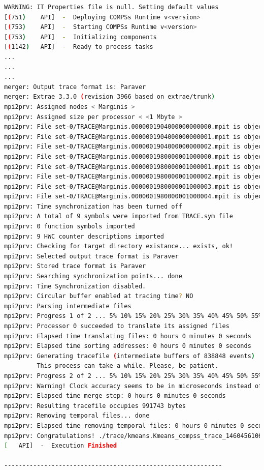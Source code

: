 \begin{lstlisting}[language=bash]
WARNING: IT Properties file is null. Setting default values
[(751)    API]  -  Deploying COMPSs Runtime v<version>
[(753)    API]  -  Starting COMPSs Runtime v<version>
[(753)    API]  -  Initializing components
[(1142)   API]  -  Ready to process tasks
...
...
...
merger: Output trace format is: Paraver
merger: Extrae 3.3.0 (revision 3966 based on extrae/trunk)
mpi2prv: Assigned nodes < Marginis >
mpi2prv: Assigned size per processor < <1 Mbyte >
mpi2prv: File set-0/TRACE@Marginis.0000001904000000000000.mpit is object 1.1.1 on node Marginis assigned to processor 0
mpi2prv: File set-0/TRACE@Marginis.0000001904000000000001.mpit is object 1.1.2 on node Marginis assigned to processor 0
mpi2prv: File set-0/TRACE@Marginis.0000001904000000000002.mpit is object 1.1.3 on node Marginis assigned to processor 0
mpi2prv: File set-0/TRACE@Marginis.0000001980000001000000.mpit is object 1.2.1 on node Marginis assigned to processor 0
mpi2prv: File set-0/TRACE@Marginis.0000001980000001000001.mpit is object 1.2.2 on node Marginis assigned to processor 0
mpi2prv: File set-0/TRACE@Marginis.0000001980000001000002.mpit is object 1.2.3 on node Marginis assigned to processor 0
mpi2prv: File set-0/TRACE@Marginis.0000001980000001000003.mpit is object 1.2.4 on node Marginis assigned to processor 0
mpi2prv: File set-0/TRACE@Marginis.0000001980000001000004.mpit is object 1.2.5 on node Marginis assigned to processor 0
mpi2prv: Time synchronization has been turned off
mpi2prv: A total of 9 symbols were imported from TRACE.sym file
mpi2prv: 0 function symbols imported
mpi2prv: 9 HWC counter descriptions imported
mpi2prv: Checking for target directory existance... exists, ok!
mpi2prv: Selected output trace format is Paraver
mpi2prv: Stored trace format is Paraver
mpi2prv: Searching synchronization points... done
mpi2prv: Time Synchronization disabled.
mpi2prv: Circular buffer enabled at tracing time? NO
mpi2prv: Parsing intermediate files
mpi2prv: Progress 1 of 2 ... 5% 10% 15% 20% 25% 30% 35% 40% 45% 50% 55% 60% 65% 70% 75% 80% 85% 90% 95% done
mpi2prv: Processor 0 succeeded to translate its assigned files
mpi2prv: Elapsed time translating files: 0 hours 0 minutes 0 seconds
mpi2prv: Elapsed time sorting addresses: 0 hours 0 minutes 0 seconds
mpi2prv: Generating tracefile (intermediate buffers of 838848 events)
         This process can take a while. Please, be patient.
mpi2prv: Progress 2 of 2 ... 5% 10% 15% 20% 25% 30% 35% 40% 45% 50% 55% 60% 65% 70% 75% 80% 85% 90% 95% done
mpi2prv: Warning! Clock accuracy seems to be in microseconds instead of nanoseconds.
mpi2prv: Elapsed time merge step: 0 hours 0 minutes 0 seconds
mpi2prv: Resulting tracefile occupies 991743 bytes
mpi2prv: Removing temporal files... done
mpi2prv: Elapsed time removing temporal files: 0 hours 0 minutes 0 seconds
mpi2prv: Congratulations! ./trace/kmeans.Kmeans_compss_trace_1460456106.prv has been generated.
[   API]  -  Execution Finished

------------------------------------------------------------
\end{lstlisting}

